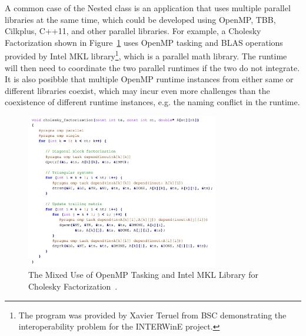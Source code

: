 A common case of the Nested class is an application that uses multiple parallel libraries at the same time, which could be developed 
using OpenMP, TBB, Cilkplus, C++11, and other parallel libraries. 
For example, a Cholesky Factorization shown in Figure~\ref{fig:cholesky} uses OpenMP 
tasking and BLAS operations provided by Intel MKL library\footnote{The program was provided by Xavier Teruel from BSC demonstrating the interoperability problem for the INTERWinE project.}, 
which is a parallel math library. The runtime will then need to coordinate the two
parallel runtimes if the two do not integrate. %
It is also posibble that multiple OpenMP runtime instances from either same or different libraries coexist, which
may incur even more challenges than the coexistence of different runtime instances, e.g. the naming conflict 
in the runtime. 
\begin{figure}[h!]
  \centering
      \includegraphics[width=0.75\textwidth]{images/cholesky}
      \caption{The Mixed Use of OpenMP Tasking and Intel MKL Library for Cholesky Factorization~\cite{intertwine}.}
 \label{fig:cholesky}
\end{figure}
